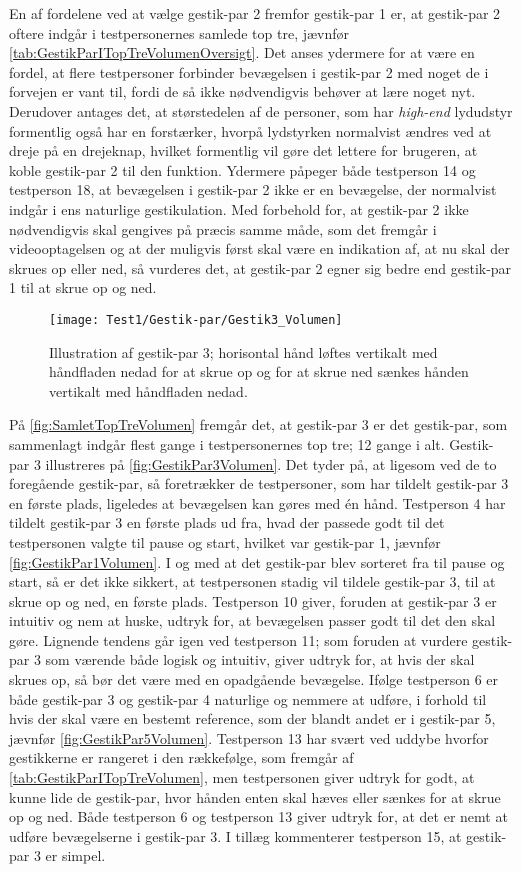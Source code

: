 En af fordelene ved at vælge gestik-par 2 fremfor gestik-par 1 er, at gestik-par 2 oftere indgår i testpersonernes samlede top tre, jævnfør \autoref{tab:GestikParITopTreVolumenOversigt}. Det anses ydermere for at være en fordel, at flere testpersoner forbinder bevægelsen i gestik-par 2 med noget de i forvejen er vant til, fordi de så ikke nødvendigvis behøver at lære noget nyt. Derudover antages det, at størstedelen af de personer, som har \textit{high-end} lydudstyr formentlig også har en forstærker, hvorpå lydstyrken normalvist ændres ved at dreje på en drejeknap, hvilket formentlig vil gøre det lettere for brugeren, at koble gestik-par 2 til den funktion. Ydermere påpeger både testperson 14 og testperson 18, at bevægelsen i gestik-par 2 ikke er en bevægelse, der normalvist indgår i ens naturlige gestikulation. Med forbehold for, at gestik-par 2 ikke nødvendigvis skal gengives på præcis samme måde, som det fremgår i videooptagelsen og at der muligvis først skal være en indikation af, at nu skal der skrues op eller ned, så vurderes det, at gestik-par 2 egner sig bedre end gestik-par 1 til at skrue op og ned.
%
\begin{figure}[H]
	\centering
	\texttt{[image: Test1/Gestik-par/Gestik3\_Volumen]}
	\caption{Illustration af gestik-par 3; horisontal hånd løftes vertikalt med håndfladen nedad for at skrue op og for at skrue ned sænkes hånden vertikalt med håndfladen nedad.}
	\label{fig:GestikPar3Volumen}
\end{figure}
\noindent
%
På \autoref{fig:SamletTopTreVolumen} fremgår det, at gestik-par 3 er det gestik-par, som sammenlagt indgår flest gange i testpersonernes top tre; 12 gange i alt. Gestik-par 3 illustreres på \autoref{fig:GestikPar3Volumen}. Det tyder på, at ligesom ved de to foregående gestik-par, så foretrækker de testpersoner, som har tildelt gestik-par 3 en første plads, ligeledes at bevægelsen kan gøres med én hånd. Testperson 4 har tildelt gestik-par 3 en første plads ud fra, hvad der passede godt til det testpersonen valgte til pause og start, hvilket var gestik-par 1, jævnfør \autoref{fig:GestikPar1Volumen}. I og med at det gestik-par blev sorteret fra til pause og start, så er det ikke sikkert, at testpersonen stadig vil tildele gestik-par 3, til at skrue op og ned, en første plads. Testperson 10 giver, foruden at gestik-par 3 er intuitiv og nem at huske, udtryk for, at bevægelsen passer godt til det den skal gøre. Lignende tendens går igen ved testperson 11; som foruden at vurdere gestik-par 3 som værende både logisk og intuitiv, giver udtryk for, at hvis der skal skrues op, så bør det være med en opadgående bevægelse. Ifølge testperson 6 er både gestik-par 3 og gestik-par 4 naturlige og nemmere at udføre, i forhold til hvis der skal være en bestemt reference, som der blandt andet er i gestik-par 5, jævnfør \autoref{fig:GestikPar5Volumen}. Testperson 13 har svært ved uddybe hvorfor gestikkerne er rangeret i den rækkefølge, som fremgår af \autoref{tab:GestikParITopTreVolumen}, men testpersonen giver udtryk for godt, at kunne lide de gestik-par, hvor hånden enten skal hæves eller sænkes for at skrue op og ned. Både testperson 6 og testperson 13 giver udtryk for, at det er nemt at udføre bevægelserne i gestik-par 3. I tillæg kommenterer testperson 15, at gestik-par 3 er simpel. 

